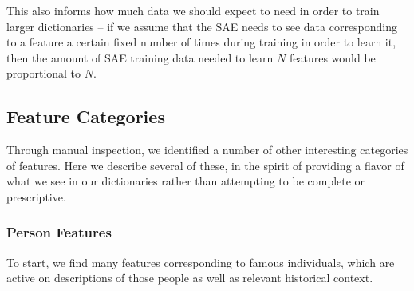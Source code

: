 \documentclass{article}
\let\oldsubsection\subsection
\renewcommand{\subsection}{\FloatBarrier\oldsubsection}
\begin{document}
This also informs how much data we should expect to need in order to train larger dictionaries -- if we assume that the SAE needs to see data corresponding to a feature a certain fixed number of times during training in order to learn it, then the amount of SAE training data needed to learn $N$ features would be proportional to $N$.

\subsection{Feature Categories}\label{sec:feature-survey-categories}

Through manual inspection, we identified a number of other interesting categories of features. Here we describe several of these, in the spirit of providing a flavor of what we see in our dictionaries rather than attempting to be complete or prescriptive.

\subsubsection{Person Features}\label{sec:feature-survey-categories-people}

To start, we find many features corresponding to famous individuals, which are active on descriptions of those people as well as relevant historical context.
\end{document}

